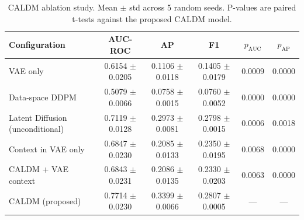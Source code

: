 \begin{table}[h]
\centering
\caption{CALDM ablation study. Mean $\pm$ std across 5 random seeds. P-values are paired t-tests against the proposed CALDM model.}
\label{tab:ablation}
\begin{tabular}{lccccc}
\toprule
Configuration & AUC-ROC & AP & F1 & $p_{\text{AUC}}$ & $p_{\text{AP}}$ \\
\midrule
VAE only & 0.6154 $\pm$ 0.0205 & 0.1106 $\pm$ 0.0118 & 0.1405 $\pm$ 0.0179 & 0.0009 & 0.0000 \\
Data-space DDPM & 0.5079 $\pm$ 0.0066 & 0.0758 $\pm$ 0.0015 & 0.0760 $\pm$ 0.0052 & 0.0000 & 0.0000 \\
Latent Diffusion (unconditional) & 0.7119 $\pm$ 0.0128 & 0.2973 $\pm$ 0.0081 & 0.2798 $\pm$ 0.0015 & 0.0006 & 0.0018 \\
Context in VAE only & 0.6847 $\pm$ 0.0230 & 0.2085 $\pm$ 0.0133 & 0.2350 $\pm$ 0.0195 & 0.0068 & 0.0000 \\
CALDM + VAE context & 0.6843 $\pm$ 0.0231 & 0.2086 $\pm$ 0.0135 & 0.2330 $\pm$ 0.0203 & 0.0063 & 0.0000 \\
CALDM (proposed) & 0.7714 $\pm$ 0.0230 & 0.3399 $\pm$ 0.0066 & 0.2807 $\pm$ 0.0005 & --- & --- \\
\bottomrule
\end{tabular}
\end{table}
